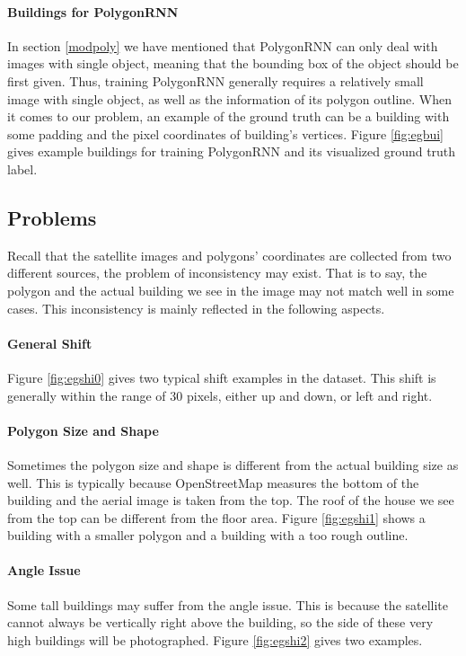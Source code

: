

\paragraph{Buildings for PolygonRNN}
In section \ref{modpoly} we have mentioned that PolygonRNN can only deal with images with single object, meaning that the bounding box of the object should be first given. Thus, training PolygonRNN generally requires a relatively small image with single object, as well as the information of its polygon outline. When it comes to our problem, an example of the ground truth can be a building with some padding and the pixel coordinates of building's vertices. Figure \ref{fig:egbui} gives example buildings for training PolygonRNN and its visualized ground truth label.



\subsection{Problems}\label{proble}

Recall that the satellite images and polygons' coordinates are collected from two different sources, the problem of inconsistency may exist. That is to say, the polygon and the actual building we see in the image may not match well in some cases. This inconsistency is mainly reflected in the following aspects.



\paragraph{General Shift}
Figure \ref{fig:egshi0} gives two typical shift examples in the dataset. This shift is generally within the range of 30 pixels, either up and down, or left and right.

\paragraph{Polygon Size and Shape}
Sometimes the polygon size and shape is different from the actual building size as well. This is typically because OpenStreetMap measures the bottom of the building and the aerial image is taken from the top. The roof of the house we see from the top can be different from the floor area. Figure \ref{fig:egshi1} shows a building with a smaller polygon and a building with a too rough outline.

\paragraph{Angle Issue}
Some tall buildings may suffer from the angle issue. This is because the satellite cannot always be vertically right above the building, so the side of these very high buildings will be photographed. Figure \ref{fig:egshi2} gives two examples.

